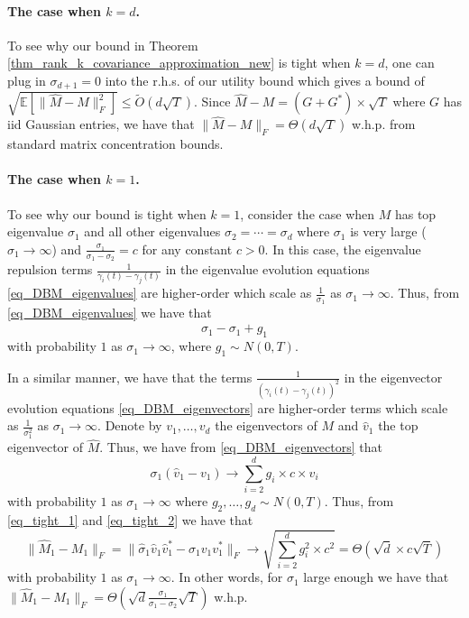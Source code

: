 \documentclass[11pt,letterpaper]{article}
\begin{document}
{
\paragraph{The case when $k=d$.}  To see why our bound in Theorem \ref{thm_rank_k_covariance_approximation_new} is tight when $k=d$, one can plug in $\sigma_{d+1} = 0$ into the r.h.s. of our utility bound which gives a bound of $\sqrt{\mathbb{E}[\|\hat{M}-M\|_F^2]} \leq \tilde{O}(d  \sqrt{T})$.
 Since $\hat{M}-M = (G + G^\ast) \times \sqrt{T}$ where $G$ has  iid Gaussian entries, we have that $\|\hat{M}-M\|_F = \Theta(d  \sqrt{T})$ w.h.p. from standard matrix concentration bounds.}
 
{
\paragraph{The case when $k=1$.} To see why our bound is tight when $k=1$,  consider the case when $M$ has top eigenvalue $\sigma_1$ and all other eigenvalues $\sigma_2= \cdots = \sigma_d$ where $\sigma_1$ is very large ($\sigma_1 \rightarrow \infty$) and  $\frac{\sigma_1}{\sigma_1- \sigma_2} = c$ for any constant $c>0$.
%
%
In this case, the eigenvalue repulsion terms $\frac{1}{\gamma_i(t) - \gamma_j(t)}$ in the eigenvalue evolution equations \eqref{eq_DBM_eigenvalues} are higher-order which scale as $\frac{1}{\sigma_1}$ as $\sigma_1 \rightarrow \infty$.
%
Thus, from \eqref{eq_DBM_eigenvalues} we have that 
%
\begin{equation}\label{eq_tight_1}
\hat{\sigma}_1 - \sigma_1 + g_1
\end{equation}
%
with probability $1$ as $\sigma_1 \rightarrow \infty$, where $g_1 \sim N(0,T)$.}


{
In a similar manner, we have that the terms $\frac{1}{(\gamma_i(t)- \gamma_j(t))^2}$ in the eigenvector evolution equations \eqref{eq_DBM_eigenvectors} are higher-order terms which scale as $\frac{1}{\sigma_1^2}$ as $\sigma_1 \rightarrow \infty$.
%
Denote by $v_1,\ldots, v_d$ the  eigenvectors of $M$ and $\hat{v}_1$ the top eigenvector of $\hat{M}$.
%
Thus, we have from  \eqref{eq_DBM_eigenvectors} that
%
 \begin{equation}\label{eq_tight_2}
 \sigma_1(\hat{v}_1 - v_1) \rightarrow \sum_{i=2}^d g_i \times c \times v_i
 \end{equation}
 with probability $1$ as $\sigma_1 \rightarrow \infty$ where $g_2,\ldots, g_d \sim N(0,T)$.
%
Thus, from \eqref{eq_tight_1} and \eqref{eq_tight_2} we have that
%
\begin{equation*}
\|\hat{M}_1 - M_1\|_F = \|\hat{\sigma}_1 \hat{v}_1 \hat{v}_1^\ast -  \sigma_1 v_1 v_1^\ast\|_F \rightarrow  \sqrt{\sum_{i=2}^d  g_i^2 \times c^2} = \Theta(\sqrt{d} \times c \sqrt{T})
\end{equation*}
with probability $1$ as $\sigma_1 \rightarrow \infty$.
%
In other words, for $\sigma_1$ large enough we have that $\|\hat{M}_1 - M_1\|_F = \Theta(\sqrt{d}  \frac{\sigma_1}{\sigma_1- \sigma_2} \sqrt{T})$ w.h.p.}
\end{document}

